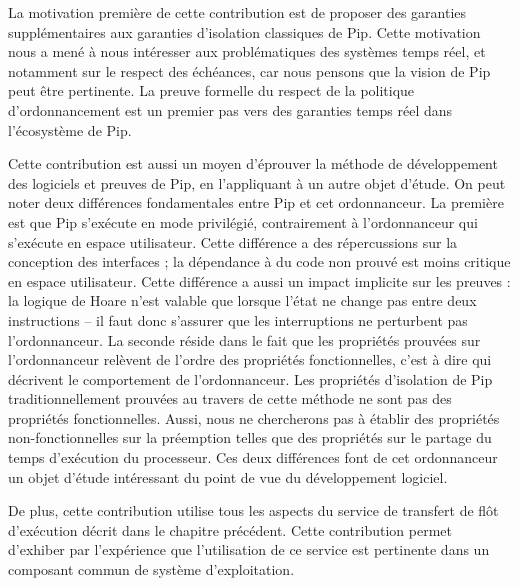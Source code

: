	La motivation première de cette contribution est de proposer des garanties supplémentaires aux garanties d'isolation classiques de Pip. Cette motivation nous a mené à nous intéresser aux problématiques des systèmes temps réel, et notamment sur le respect des échéances, car nous pensons que la vision de Pip peut être pertinente. La preuve formelle du respect de la politique d'ordonnancement est un premier pas vers des garanties temps réel dans l'écosystème de Pip.

	Cette contribution est aussi un moyen d'éprouver la méthode de développement des logiciels et preuves de Pip, en l'appliquant à un autre objet d'étude. On peut noter deux différences fondamentales entre Pip et cet ordonnanceur. La première est que Pip s'exécute en mode privilégié, contrairement à l'ordonnanceur qui s'exécute en espace utilisateur. Cette différence a des répercussions sur la conception des interfaces ; la dépendance à du code non prouvé est moins critique en espace utilisateur. Cette différence a aussi un impact implicite sur les preuves : la logique de Hoare n'est valable que lorsque l'état ne change pas entre deux instructions -- il faut donc s'assurer que les interruptions ne perturbent pas l'ordonnanceur. La seconde réside dans le fait que les propriétés prouvées sur l'ordonnanceur relèvent de l'ordre des propriétés fonctionnelles, c'est à dire qui décrivent le comportement de l'ordonnanceur. Les propriétés d'isolation de Pip traditionnellement prouvées au travers de cette méthode ne sont pas des propriétés fonctionnelles. Aussi, nous ne chercherons pas à établir des propriétés non-fonctionnelles sur la préemption telles que des propriétés sur le partage du temps d'exécution du processeur. Ces deux différences font de cet ordonnanceur un objet d'étude intéressant du point de vue du développement logiciel.

	De plus, cette contribution utilise tous les aspects du service de transfert de flôt d'exécution décrit dans le chapitre précédent. Cette contribution permet d'exhiber par l'expérience que l'utilisation de ce service est pertinente dans un composant commun de système d'exploitation.
	
